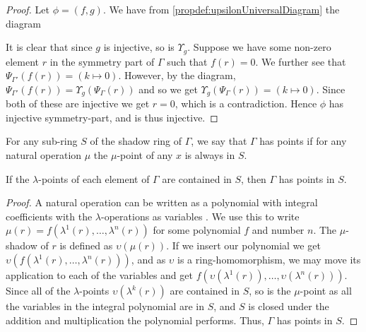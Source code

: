 \begin{proof}
  Let $\phi = (f, g)$. We have from \ref{propdef:upsilonUniversalDiagram} the diagram
  \begin{center}
  \end{center}
  It is clear that since $g$ is injective, so is $\Upsilon_{g}$. Suppose we have some non-zero element $r$ in the symmetry part of $\Gamma$ such that $f(r) = 0$. We further see that $\Psi_{\Gamma'}(f(r)) = (k \mapsto 0)$. However, by the diagram, $\Psi_{\Gamma'}(f(r)) = \Upsilon_g(\Psi_{\Gamma}(r))$ and so we get $\Upsilon_g(\Psi_{\Gamma}(r)) = (k \mapsto 0)$. Since both of these are injective we get $r = 0$, which is a contradiction. Hence $\phi$ has injective symmetry-part, and is thus injective. \qedhere
\end{proof}

\begin{definition}
  For any sub-ring $S$ of the shadow ring of $\Gamma$, we say that $\Gamma$ has points if for any natural operation $\mu$ the $\mu$-point of any $x$ is always in $S$.
\end{definition}

\begin{proposition}
  If the $\lambda$-points of each element of $\Gamma$ are contained in $S$, then $\Gamma$ has points in $S$.
\end{proposition}

\begin{proof}
  A natural operation can be written as a polynomial with integral coefficients with the $\lambda$-operations as variables . We use this to write $\mu(r) = f(\lambda^1(r), \ldots, \lambda^n(r))$ for some polynomial $f$ and number $n$. The $\mu$-shadow of $r$ is defined as $\upsilon(\mu(r))$. If we insert our polynomial we get $\upsilon(f(\lambda^1(r), \ldots, \lambda^n(r)))$, and as $\upsilon$ is a ring-homomorphism, we may move its application to each of the variables and get $f(\upsilon(\lambda^1(r)), \ldots, \upsilon(\lambda^n(r)))$. Since all of the $\lambda$-points $\upsilon(\lambda^k(r))$ are contained in $S$, so is the $\mu$-point as all the variables in the integral polynomial are in $S$, and $S$ is closed under the addition and multiplication the polynomial performs. Thus, $\Gamma$ has points in $S$.
\end{proof}

